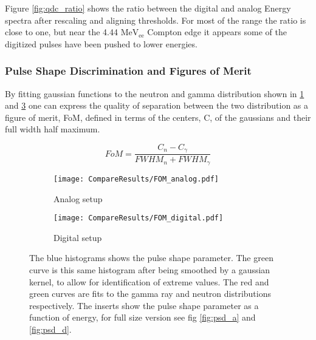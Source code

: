 \documentclass[main.tex]{subfiles}
\begin{document}
Figure \ref{fig:qdc_ratio} shows the ratio between the digital and analog Energy spectra after rescaling and aligning thresholds. For most of the range the ratio is close to one, but near the 4.44 $\text{MeV}_\text{ee}$ Compton edge it appears some of the digitized pulses have been pushed to lower energies. 

\subsubsection{Pulse Shape Discrimination and Figures of Merit}
By fitting gaussian functions to the neutron and gamma distribution shown in \ref{fig:fom_analog} and \ref{fig:fom_digital} one can express the quality of separation between the two distribution as a figure of merit, FoM, defined in terms of the centers, C, of the gaussians and their full width half maximum.

\begin{equation}
FoM = \frac{C_n - C_\gamma}{FWHM_n + FWHM_\gamma}
\end{equation}

\begin{figure}[ht]
	\begin{subfigure}[b]{\textwidth}
	    \centering
    	    \texttt{[image: CompareResults/FOM\_analog.pdf]}
        	\caption{Analog setup}
	    \label{fig:fom_analog} 
	\end{subfigure}
	\begin{subfigure}[b]{\textwidth}
    	\centering
        	\texttt{[image: CompareResults/FOM\_digital.pdf]}
        	\caption{Digital setup}
    	\label{fig:fom_digital} 
    \end{subfigure}
    \caption{The blue histograms shows the pulse shape parameter. The green curve is this same histogram after being smoothed by a gaussian kernel, to allow for identification of extreme values. The red and green curves are fits to the gamma ray and neutron distributions respectively. The inserts show the pulse shape parameter as a function of energy, for full size version see fig \ref{fig:psd_a} and \ref{fig:psd_d}. }
\end{figure}
\end{document}
